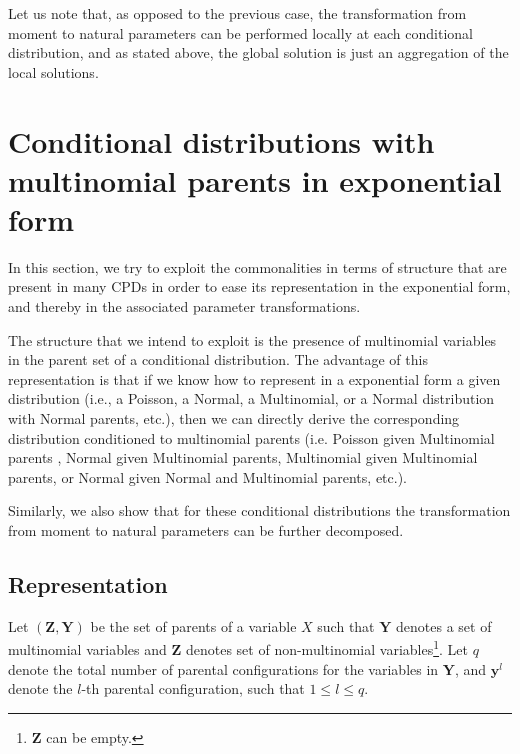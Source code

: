 \documentclass[11pt, oneside]{article}   	%
\newcommand{\bm}{\mathbf}
\numberwithin{figure}{section}
\numberwithin{equation}{section}
\numberwithin{table}{section}
\theoremstyle{definition}
\begin{document}
Let us note that, as opposed to the previous case, the transformation from moment to natural parameters can be performed locally at each conditional distribution, and as stated above, the global solution is just an aggregation of the local solutions.

\section{Conditional distributions with multinomial parents in exponential form}\label{Section:CD_With_MParents}

In this section, we try to exploit the commonalities in terms of structure that are present in many CPDs in order to ease its representation in the exponential form, and thereby in the associated parameter transformations.  

The structure that we intend to exploit is the presence of multinomial variables in the parent set of a conditional distribution. The advantage of this representation is that if we know how to represent in a exponential form a given distribution (i.e., a Poisson, a Normal, a Multinomial, or a Normal distribution with Normal parents, etc.), then we can directly derive the corresponding distribution conditioned to multinomial parents (i.e. Poisson given Multinomial parents , Normal given Multinomial parents, Multinomial given Multinomial parents, or Normal given Normal and Multinomial parents, etc.). 

Similarly, we also show that for these conditional distributions the transformation from moment to natural parameters can be further decomposed. 

\subsection{Representation} \label{Section:CD_With_MParents:Representation}

Let $(\bm Z, \bm Y)$ be the set of parents of a variable $X$ such that $\mathbf{Y}$ denotes a set of multinomial variables and $\bm Z$ denotes set of non-multinomial variables\footnote{$\bm Z$ can be empty.}.  Let $q$ denote the total number of parental configurations for the variables in $\bm Y$, and $\mathbf{y}^l$ denote the $l$-th parental configuration, such that $1 \leq l \leq q$.
\end{document}
